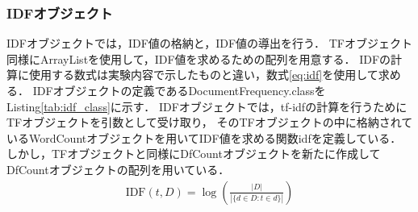 \documentclass[a4paper,11pt]{ltjsarticle}
\begin{document}
\subsubsection{IDFオブジェクト}
IDFオブジェクトでは，IDF値の格納と，IDF値の導出を行う．
TFオブジェクト同様にArrayListを使用して，IDF値を求めるための配列を用意する．
IDFの計算に使用する数式は実験内容で示したものと違い，数式\eqref{eq:idf}を使用して求める．
IDFオブジェクトの定義であるDocumentFrequency.classをListing\ref{tab:idf_class}に示す．
IDFオブジェクトでは，tf-idfの計算を行うためにTFオブジェクトを引数として受け取り，
そのTFオブジェクトの中に格納されているWordCountオブジェクトを用いてIDF値を求める関数idfを定義している．
しかし，TFオブジェクトと同様にDfCountオブジェクトを新たに作成してDfCountオブジェクトの配列を用いている．
\begin{align}
    \label{tab:idf_class}
    \text{IDF}(t, D) = \log\left(\frac{|D|}{|\{d \in D : t \in d\}|}\right)
\end{align}
\end{document}
